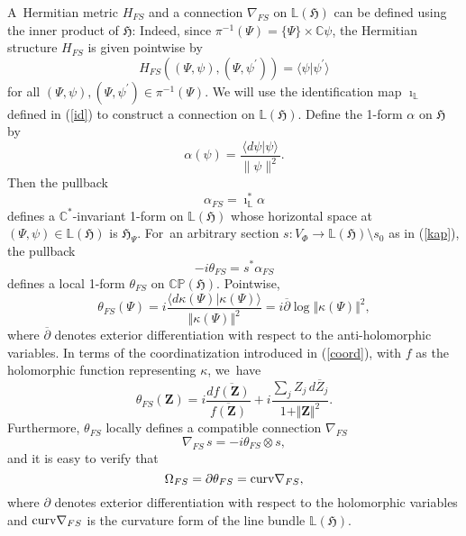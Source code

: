 \documentclass[12pt]{amsart}
\numberwithin{equation}{section}
\theoremstyle{remark}
\newcommand\HH{\mathfrak H}
\newcommand{\prhs}{{\mathbb C\mathbb P}( \HH)}
\newcommand{\C}{\mathbb C}
\begin{document}
A~Hermitian metric $H_{FS}$ and a connection $\nabla_{FS}$ on $\mathbb L(\HH)$
can be defined using the inner product of $\HH$: Indeed, since $\pi^{-1}(\Psi)
= \{\Psi\} \times {\C} \psi$, the Hermitian structure $H_{FS}$ is  given
pointwise by
\begin{equation}
H_{FS}((\Psi, \psi),(\Psi, \psi^\prime)) = \langle \psi \vert \psi^\prime
\rangle \end{equation}
for all $(\Psi, \psi),(\Psi, \psi^\prime) \in \pi^{-1}(\Psi)$.  We will use
the identification map $\imath_\mathbb L$ defined in (\ref{id}) to construct a
connection on $\mathbb L(\HH)$. Define the 1-form $\alpha $ on $\HH$ by
\begin{equation}
\alpha(\psi)= \frac{\langle d\psi \vert \psi \rangle}{\|\psi\|^2} .
 \end{equation}
Then the pullback
\begin{equation}
\alpha_{FS} = \imath^*_\mathbb L \alpha
\end{equation}
defines a ${\C}^*$-invariant 1-form on $\mathbb L(\HH)$ whose horizontal space
at $(\Psi, \psi) \in \mathbb L(\HH)$ is $\HH_\Psi$. For~an arbitrary section
$s: V_\Phi \to \mathbb L(\HH) \setminus s_0$ as in (\ref{kap}), the pullback
\begin{equation}\label{pot}
-i\theta_{FS} = s^*\alpha_{FS}
\end{equation}
defines a local 1-form $\theta_{FS}$ on $\prhs$. Pointwise,
\begin{equation}
\theta_{FS}(\Psi) = i\frac{\langle d\kappa(\Psi)\vert
\kappa(\Psi)\rangle}{\Vert \kappa(\Psi) \Vert^2} = i\overline{\partial} \log
\Vert \kappa(\Psi)\Vert^2 ,
\end{equation}
where $\overline{\partial}$ denotes exterior differentiation with respect to
the anti-holomorphic variables. In terms of the coordinatization introduced in
(\ref{coord}), with $f$ as the holomorphic function representing $\kappa$,
we~have
\begin{equation}
\theta_{FS}({\mathbf Z}) = i\frac{d\overline{f({\mathbf Z})}}
  {\overline{f({\mathbf Z})}} + i\frac{\sum_j Z_j\,d\overline{Z}_{j}}
  {1 + \Vert {\mathbf Z}\Vert^2}.
\end{equation}
Furthermore, $\theta_{FS}$ locally defines a compatible connection
$\nabla_{FS}$
\begin{equation}
\nabla_{FS}\,s = -i\theta_{FS} \otimes s,
\end{equation}
and it is easy to verify that
\begin{equation}
\Omega_{FS} = \partial \theta_{FS} =  \mbox{\rm curv}\nabla_{FS},
\end{equation}
where $\partial$ denotes exterior differentiation with respect to the
holomorphic variables and $\mbox{\rm curv}\nabla_{FS}$ is the curvature form
of the line bundle $\mathbb L(\HH)$.
\end{document}
